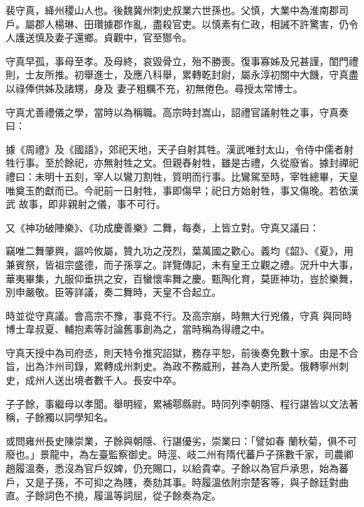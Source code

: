 \begin{pinyinscope}
 裴守真，絳州稷山人也。後魏冀州刺史叔業六世孫也。父慎，大業中為淮南郡司戶。屬郡人楊琳、田瓚據郡作亂，盡殺官吏。以慎素有仁政，相誡不許驚害，仍令人護送慎及妻子還鄉。貞觀中，官至酂令。



 守真早孤，事母至孝。及母終，哀毀骨立，殆不勝喪。復事寡姊及兄甚謹，閨門禮則，士友所推。初舉進士，及應八科舉，累轉乾封尉，屬永淳初關中大饑，守真盡以祿俸供姊及諸甥，身及
 妻子粗糲不充，初無倦色。尋授太常博士。



 守真尤善禮儀之學，當時以為稱職。高宗時封嵩山，詔禮官議射牲之事，守真奏曰：



 據《周禮》及《國語》，郊祀天地，天子自射其牲。漢武唯封太山，令侍中儒者射牲行事。至於餘祀，亦無射牲之文。但親舂射牲，雖是古禮，久從廢省。據封禪祀禮曰：未明十五刻，宰人以鸞刀割牲，質明而行事。比鸞駕至時，宰牲總畢，天皇唯奠玉酌獻而已。今祀前一日射牲，事即傷早；祀日方始射牲，事又傷晚。若依漢武
 故事，即非親射之儀，事不可行。



 又《神功破陣樂》、《功成慶善樂》二舞，每奏，上皆立對。守真又議曰：



 竊唯二舞肇興，謳吟攸屬，贊九功之茂烈，葉萬國之歡心。義均《韶》、《夏》，用兼賓祭，皆祖宗盛德，而子孫享之。詳覽傳記，未有皇王立觀之禮。況升中大事，華夷畢集，九服仰垂拱之安，百蠻懷率舞之慶。甄陶化育，莫匪神功，豈於樂舞，別申嚴敬。臣等詳議，奏二舞時，天皇不合起立。



 時並從守真議。會高宗不豫，事竟不行。及高宗崩，時無大行兇儀，守真
 與同時博士韋叔夏、輔抱素等討論舊事創為之，當時稱為得禮之中。



 守真天授中為司府丞，則天特令推究詔獄，務存平恕，前後奏免數十家。由是不合旨，出為汴州司錄，累轉成州刺史。為政不務威刑，甚為人吏所愛。俄轉寧州刺史，成州人送出境者數千人。長安中卒。



 子子餘，事繼母以孝聞。舉明經，累補鄠縣尉。時同列李朝隱、程行諶皆以文法著稱，子餘獨以詞學知名。



 或問雍州長史陳崇業，子餘與朝隱、行諶優劣，崇業曰：「譬如春
 蘭秋菊，俱不可廢也。」景龍中，為左臺監察御史。時涇、岐二州有隋代蕃戶子孫數千家，司農卿趙履溫奏，悉沒為官戶奴婢，仍充賜口，以給貴幸。子餘以為官戶承恩，始為蕃戶，又是子孫，不可抑之為賤，奏劾其事。時履溫依附宗楚客等，與子餘廷對曲直。子餘詞色不撓，履溫等詞屈，從子餘奏為定。




\end{pinyinscope}

